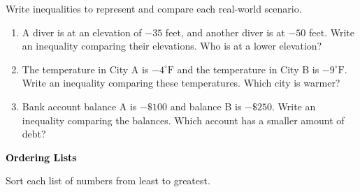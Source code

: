 \documentclass[12pt, letterpaper, fleqn]{article}
\begin{document}
\noindent
Write inequalities to represent and compare each real-world scenario.

\vspace{3mm}

\begin{enumerate}[itemsep=2.2cm, leftmargin=0.6cm]

\item A diver is at an elevation of $-35$ feet, and another diver is at $-50$ feet. Write an inequality comparing their elevations. Who is at a lower elevation?

\vspace{2cm}

\item The temperature in City A is $-4^\circ\text{F}$ and the temperature in City B is $-9^\circ\text{F}$. Write an inequality comparing these temperatures. Which city is warmer?

\vspace{2cm}

\item Bank account balance A is $-\$100$ and balance B is $-\$250$. Write an inequality comparing the balances. Which account has a smaller amount of debt?

\vspace{2cm}

\end{enumerate}

\newpage

\begin{tcolorbox}[colback=black!10]
\large\textcolor{black}{\textbf{Ordering Lists}}
\end{tcolorbox}

\noindent
Sort each list of numbers from least to greatest.

\vspace{3mm}
\end{document}
